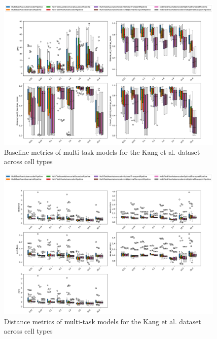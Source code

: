 \documentclass[12pt, a4paper]{article}
\begin{document}
\begin{figure}[h!]
    \centering
    \includegraphics[width=\textwidth]{multi_task_benchmarking_doses_baseline_metrics.png}
    \caption{Baseline metrics of multi-task models for the Kang et al. \cite{kanaGenerativeModelingSinglecell2023} dataset across cell types}
\end{figure}

\begin{figure}[h!]
    \centering
    \includegraphics[width=\textwidth]{multi_task_benchmarking_doses_distance_metrics.png}
    \caption{Distance metrics of multi-task models for the Kang et al. \cite{kanaGenerativeModelingSinglecell2023} dataset across cell types}
\end{figure}
\end{document}
